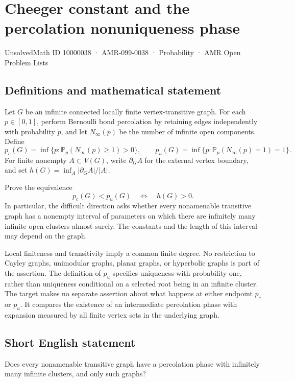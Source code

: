 \documentclass[11pt,a4paper]{article}
\begin{document}
\section*{Cheeger constant and the percolation nonuniqueness phase}\label{10000038}
{\small UnsolvedMath ID 10000038 · AMR-099-0038 · Probability · AMR Open Problem Lists}
\subsection{Definitions and mathematical statement}
Let $G$ be an infinite connected locally finite vertex-transitive graph. For each $p\in[0,1]$, perform Bernoulli bond percolation by retaining edges independently with probability $p$, and let $N_\infty(p)$ be the number of infinite open components. Define
\[
p_c(G)=\inf\{p:\mathbb P_p(N_\infty(p)\ge1)>0\},
\qquad
p_u(G)=\inf\{p:\mathbb P_p(N_\infty(p)=1)=1\}.
\]
For finite nonempty $A\subset V(G)$, write $\partial_G A$ for the external vertex boundary, and set $h(G)=\inf_A|\partial_G A|/|A|$.

Prove the equivalence
\[
p_c(G)<p_u(G)\quad\Longleftrightarrow\quad h(G)>0.
\]
In particular, the difficult direction asks whether every nonamenable transitive graph has a nonempty interval of parameters on which there are infinitely many infinite open clusters almost surely. The constants and the length of this interval may depend on the graph.

Local finiteness and transitivity imply a common finite degree. No restriction to Cayley graphs, unimodular graphs, planar graphs, or hyperbolic graphs is part of the assertion. The definition of $p_u$ specifies uniqueness with probability one, rather than uniqueness conditional on a selected root being in an infinite cluster. The target makes no separate assertion about what happens at either endpoint $p_c$ or $p_u$. It compares the existence of an intermediate percolation phase with expansion measured by all finite vertex sets in the underlying graph.
\subsection{Short English statement}
Does every nonamenable transitive graph have a percolation phase with infinitely many infinite clusters, and only such graphs?
\end{document}
